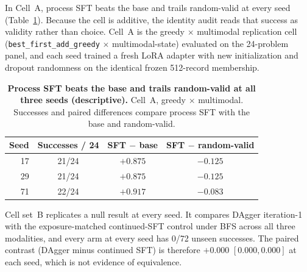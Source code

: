 In Cell~A, process SFT beats the base and trails random-valid at every seed (Table~\ref{tab:appendix-seeds}). Because the cell is additive, the identity audit reads that success as validity rather than choice. Cell~A is the greedy $\times$ multimodal replication cell (\texttt{best\_first\_add\_greedy} $\times$ multimodal-state) evaluated on the 24-problem panel, and each seed trained a fresh LoRA adapter with new initialization and dropout randomness on the identical frozen 512-record membership.

\begin{table}[t]
\caption{\textbf{Process SFT beats the base and trails random-valid at all three seeds (descriptive).} Cell~A, greedy $\times$ multimodal. Successes and paired differences compare process SFT with the base and random-valid.}
\label{tab:appendix-seeds}
\centering\footnotesize
\setlength{\tabcolsep}{4pt}
\begin{tabular}{rccc}
\toprule[0.4mm]
\rowcolor{mygray}\textbf{Seed} & \textbf{Successes / 24} & \textbf{SFT $-$ base} & \textbf{SFT $-$ random-valid} \\
\midrule
17 & 21/24 & $+0.875$ & $-0.125$ \\
29 & 21/24 & $+0.875$ & $-0.125$ \\
71 & 22/24 & $+0.917$ & $-0.083$ \\
\bottomrule
\end{tabular}
\end{table}

Cell set~B replicates a null result at every seed. It compares DAgger iteration-1 with the exposure-matched continued-SFT control under BFS across all three modalities, and every arm at every seed has 0/72 unseen successes. The paired contrast (DAgger minus continued SFT) is therefore $+0.000$ $[0.000, 0.000]$ at each seed, which is not evidence of equivalence.

